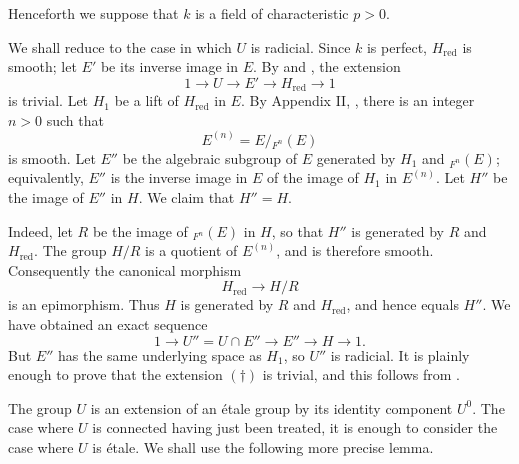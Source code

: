 Henceforth we suppose that \(k\) is a field of characteristic
\(p>0\).

We shall reduce to the case in which \(U\) is radicial.  Since
\(k\) is perfect, \(H_{\mathrm{red}}\) is smooth; let \(E'\) be
its inverse image in \(E\).  By  and , the
extension
\[
  1\longrightarrow U\longrightarrow E'
    \longrightarrow H_{\mathrm{red}}\longrightarrow1
\]
is trivial.  Let \(H_1\) be a lift of \(H_{\mathrm{red}}\) in
\(E\).  By Appendix II, , there is an integer \(n>0\) such
that
\[
  E^{(n)}=E/{}_{F^n}(E)
\]
is smooth.  Let \(E''\) be the algebraic subgroup of \(E\)
generated by \(H_1\) and \({}_{F^n}(E)\); equivalently, \(E''\)
is the inverse image in \(E\) of the image of \(H_1\) in
\(E^{(n)}\).  Let \(H''\) be the image of \(E''\) in \(H\).  We
claim that \(H''=H\).

Indeed, let \(R\) be the image of \({}_{F^n}(E)\) in \(H\), so
that \(H''\) is generated by \(R\) and \(H_{\mathrm{red}}\).
The group \(H/R\) is a quotient of \(E^{(n)}\), and is therefore
smooth.  Consequently the canonical morphism
\[
  H_{\mathrm{red}}\longrightarrow H/R
\]
is an epimorphism.  Thus \(H\) is generated by \(R\) and
\(H_{\mathrm{red}}\), and hence equals \(H''\).  We have obtained
an exact sequence
\[
  \tag{\(\dagger\)}\label{sga3:xvii:subsection:5-5:equation:dagger}
  1\longrightarrow U''=U\cap E''
    \longrightarrow E''\longrightarrow H\longrightarrow1.
\]
But \(E''\) has the same underlying space as \(H_1\), so \(U''\)
is radicial.  It is plainly enough to prove that the extension
\((\dagger)\) is trivial, and this follows from .

The group \(U\) is an extension of an étale group by its identity
component \(U^0\).  The case where \(U\) is connected having just
been treated, it is enough to consider the case where \(U\) is
étale.  We shall use the following more precise lemma.


